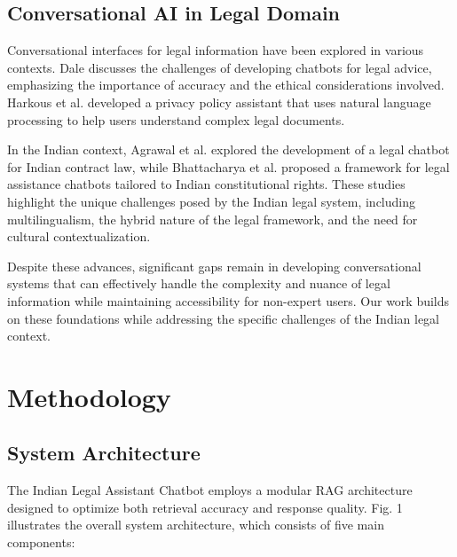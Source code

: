 \documentclass[conference]{IEEEtran}
\begin{document}
\subsection{Conversational AI in Legal Domain}

Conversational interfaces for legal information have been explored in various contexts. Dale \cite{dale2019} discusses the challenges of developing chatbots for legal advice, emphasizing the importance of accuracy and the ethical considerations involved. Harkous et al. \cite{harkous2018} developed a privacy policy assistant that uses natural language processing to help users understand complex legal documents.

In the Indian context, Agrawal et al. \cite{agrawal2022} explored the development of a legal chatbot for Indian contract law, while Bhattacharya et al. \cite{bhattacharya2021} proposed a framework for legal assistance chatbots tailored to Indian constitutional rights. These studies highlight the unique challenges posed by the Indian legal system, including multilingualism, the hybrid nature of the legal framework, and the need for cultural contextualization.

Despite these advances, significant gaps remain in developing conversational systems that can effectively handle the complexity and nuance of legal information while maintaining accessibility for non-expert users. Our work builds on these foundations while addressing the specific challenges of the Indian legal context.

\section{Methodology}

\subsection{System Architecture}

The Indian Legal Assistant Chatbot employs a modular RAG architecture designed to optimize both retrieval accuracy and response quality. Fig. 1 illustrates the overall system architecture, which consists of five main components:
\end{document}
